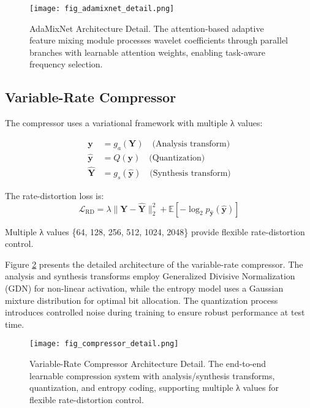 \documentclass[conference]{IEEEtran}
\begin{document}
\begin{figure}[htbp]
\centering
\texttt{[image: fig\_adamixnet\_detail.png]}
\caption{AdaMixNet Architecture Detail. The attention-based adaptive feature mixing module processes wavelet coefficients through parallel branches with learnable attention weights, enabling task-aware frequency selection.}
\label{fig:adamixnet_detail}
\end{figure}

\subsection{Variable-Rate Compressor}

The compressor uses a variational framework with multiple λ values:

\begin{align}
\mathbf{y} &= g_a(\mathbf{Y}) \quad \text{(Analysis transform)} \\
\hat{\mathbf{y}} &= Q(\mathbf{y}) \quad \text{(Quantization)} \\
\hat{\mathbf{Y}} &= g_s(\hat{\mathbf{y}}) \quad \text{(Synthesis transform)}
\end{align}

The rate-distortion loss is:
\begin{equation}
\mathcal{L}_{\text{RD}} = \lambda \|\mathbf{Y} - \hat{\mathbf{Y}}\|_2^2 + \mathbb{E}[-\log_2 p_{\hat{\mathbf{y}}}(\hat{\mathbf{y}})]
\end{equation}

Multiple λ values \{64, 128, 256, 512, 1024, 2048\} provide flexible rate-distortion control.

Figure \ref{fig:compressor_detail} presents the detailed architecture of the variable-rate compressor. The analysis and synthesis transforms employ Generalized Divisive Normalization (GDN) for non-linear activation, while the entropy model uses a Gaussian mixture distribution for optimal bit allocation. The quantization process introduces controlled noise during training to ensure robust performance at test time.

\begin{figure}[htbp]
\centering
\texttt{[image: fig\_compressor\_detail.png]}
\caption{Variable-Rate Compressor Architecture Detail. The end-to-end learnable compression system with analysis/synthesis transforms, quantization, and entropy coding, supporting multiple λ values for flexible rate-distortion control.}
\label{fig:compressor_detail}
\end{figure}
\end{document}
